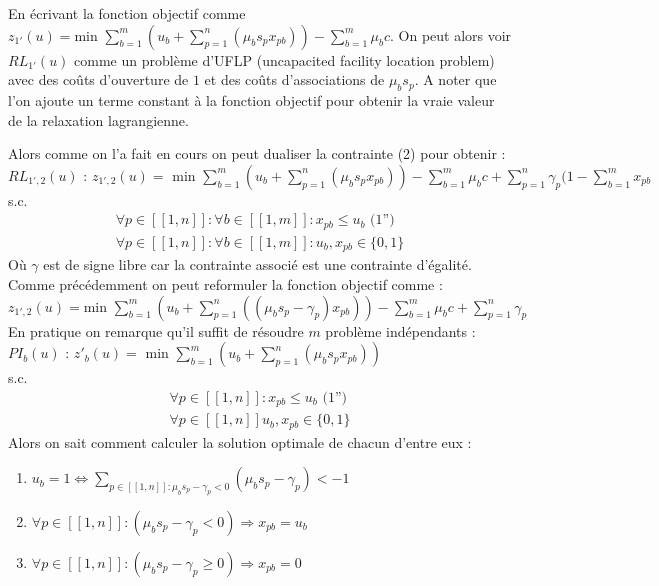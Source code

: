 \documentclass{article}
\begin{document}
En écrivant la fonction objectif comme  $z_{1'}(u) = \text{min } \sum \limits_{b = 1}^{m}( u_b + \sum \limits_{p = 1}^n (\mu_b s_p x_{pb})) - \sum \limits_{b = 1}^{m} \mu_b c$. On peut alors voir $RL_{1'}(u)$ comme un problème d'UFLP (uncapacited facility location problem) avec des coûts d'ouverture de $1$ et des coûts d'associations de $\mu_b s_p$. A noter que l'on ajoute un terme constant à la fonction objectif pour obtenir la vraie valeur de la relaxation lagrangienne.

Alors comme on l'a fait en cours on peut dualiser la contrainte (2) pour obtenir :\\
$RL_{1',2}(u) \text{ : } z_{1',2}(u) = \text{ min } \sum \limits_{b = 1}^{m}( u_b + \sum \limits_{p = 1}^n (\mu_b s_p x_{pb})) - \sum \limits_{b = 1}^{m} \mu_b c + \sum \limits_{p = 1}^n \gamma_p (1 - \sum \limits_{b = 1}^m x_{pb}$\\
s.c.
\begin{align*}
 \forall p \in [\![ 1 , n ]\!] : \forall b \in [\![ 1 , m ]\!] : x_{pb} \leqslant u_b \text{ (1'')}\\
 \forall p \in [\![ 1 , n ]\!] : \forall b \in [\![ 1 , m ]\!] : u_b , x_{pb} \in \{0,1\}
\end{align*}
Où $\gamma$ est de signe libre car la contrainte associé est une contrainte d'égalité.\\
Comme précédemment on peut reformuler la fonction objectif comme : \\
$z_{1',2}(u) = \text{min } \sum \limits_{b = 1}^{m}( u_b + \sum \limits_{p = 1}^n ((\mu_b s_p - \gamma_p) x_{pb})) - \sum \limits_{b = 1}^{m} \mu_b c + \sum \limits_{p = 1}^{n} \gamma_p$\\
En pratique on remarque qu'il suffit de résoudre $m$ problème indépendants :\\
$PI_{b}(u) \text{ : } z'_{b}(u) = \text{ min } \sum \limits_{b = 1}^{m}( u_b + \sum \limits_{p = 1}^n (\mu_b s_p x_{pb}))$\\
s.c.
\begin{align*}
 \forall p \in [\![ 1 , n ]\!] : x_{pb} \leqslant u_b \text{ (1'')}\\
 \forall p \in [\![ 1 , n ]\!] u_b , x_{pb} \in \{0,1\}
\end{align*}
Alors on sait comment calculer la solution optimale de chacun d'entre eux :
\begin{enumerate}[1 - ]
\item
$u_b = 1 \Leftrightarrow \sum \limits_{ p \in [\![ 1 , n ]\!] : \mu_b s_p - \gamma_p < 0} (\mu_b s_p - \gamma_p) < -1$
\item
$\forall p \in [\![ 1 , n ]\!] : (\mu_b s_p - \gamma_p < 0) \Rightarrow x_{pb} = u_b$
\item
$\forall p \in [\![ 1 , n ]\!] : (\mu_b s_p - \gamma_p \geqslant 0) \Rightarrow x_{pb} = 0$
\end{enumerate}
\end{document}
